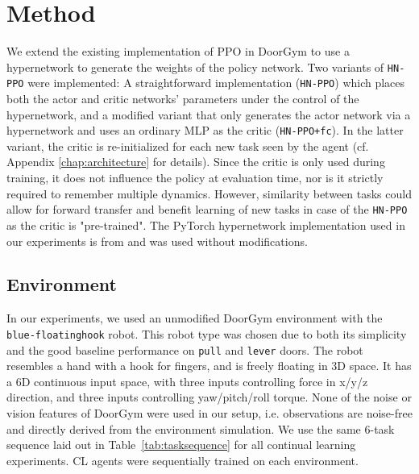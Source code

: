 \documentclass[dvipsnames]{article} %
\newcommand{\commentOLD}[1]{}
\newcommand{\saOLD}[1] {\commentOLD{{\color{cyan} SA: #1}}}                %
\newcommand{\asOLD}[1] {\commentOLD{{\color{orange} AS: #1}}}              %
\begin{document}
\section{Method}
We extend the existing implementation of PPO in DoorGym to use a hypernetwork to generate the weights of the policy network. Two variants of \texttt{HN-PPO} were implemented: A straightforward implementation (\texttt{HN-PPO}) which places both the actor and critic networks' parameters under the control of the hypernetwork, and a modified variant that only generates the actor network via a hypernetwork and uses an ordinary MLP as the critic (\texttt{HN-PPO+fc}). In the latter variant, the critic is re-initialized for each new task seen by the agent (cf. Appendix \ref{chap:architecture} for details). Since the critic is only used during training, it does not influence the policy at evaluation time, nor is it strictly required to remember multiple dynamics. However, similarity between tasks could allow for forward transfer and benefit learning of new tasks in case of the \texttt{HN-PPO} as the critic is "pre-trained".
The PyTorch hypernetwork implementation used in our experiments is from \cite{auddyHollensteinClfd} and was used without modifications. 

\subsection{Environment \asOLD{I think what you wrote about DoorGym should go here, otherwise it is way too many places.}}
\saOLD{Add a subsection for the RL environment and describe here the details of the RL setup and tasks, including any modifications that you made to the default door-gym and the reasons for such modifications. This needs to be connected to the content about door-gym in the background section. So, in the background, you can describe the default door-gym environment and in this section you can describe your specific tasks and modifications.}
In our experiments, we used an unmodified DoorGym \citep{doorgym} environment with the \texttt{blue-floatinghook} robot. This robot type was chosen due to both its simplicity and the good baseline performance on \texttt{pull} and \texttt{lever} doors. The robot resembles a hand with a hook for fingers, and is freely floating in 3D space. It has a 6D continuous input space, with three inputs controlling force in x/y/z direction, and three inputs controlling yaw/pitch/roll torque. None of the noise or vision features of DoorGym were used in our setup, i.e. observations are noise-free and directly derived from the environment simulation. We use the same 6-task sequence laid out in Table~\ref{tab:tasksequence} for all continual learning experiments. CL agents were sequentially trained on each environment. %
\saOLD{Some example images would be nice to have.}
\end{document}
